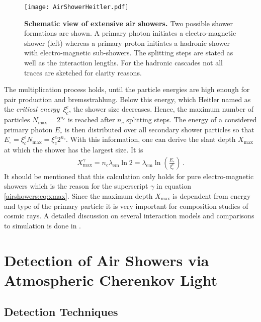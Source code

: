 \begin{figure}[h]
	\texttt{[image: AirShowerHeitler.pdf]}
	\caption[Schematic view of extensive air showers]{\textbf{Schematic view of extensive air showers. \cite{famous:niggemann}} Two possible shower formations are shown. A primary photon initiates a electro-magnetic shower (left) whereas a primary proton initiates a hadronic shower with electro-magnetic sub-showers. The splitting steps are stated as well as the interaction lengths. For the hadronic cascades not all traces are sketched for clarity reasons.}	
	\label{airshowers:cascades}
\end{figure}

The multiplication process holds, until the particle energies are high enough for pair production and bremsstrahlung. Below this energy, which Heitler named as the \textit{critical energy}~$\xi_c^e$, the shower size decreases. Hence, the maximum number of particles $N_\text{max} = 2^{n_c}$ is reached after $n_c$ splitting steps. The energy of a considered primary photon $E_\circ$ is then distributed over all secondary shower particles so that $E_\circ = \xi_c^e N_\text{max} = \xi_c^e 2^{n_c}$. With this information, one can derive the slant depth $X_\text{max}$ at which the shower has the largest size. It is
\begin{align}
	X_\text{max}^\gamma = n_c\lambda_\text{em}\ln{2} = \lambda_\text{em}\ln{\left(\frac{E_\circ}{\xi_c^e}\right)}\,.
	\label{airshowers:eq:xmax}
\end{align}
It should be mentioned that this calculation only holds for pure electro-magnetic showers which is the reason for the superscript $\gamma$ in equation \eqref{airshowers:eq:xmax}. \cite{airshowers:heitlermodel}
Since the maximum depth $X_\text{max}$ is dependent from energy and type of the primary particle it is very important for composition studies of cosmic rays. A detailed discussion on several interaction models and comparisons to simulation is done in \cite{airshowers:heitlermodel}.

\section{Detection of Air Showers via Atmospheric Cherenkov Light}\label{sec:cherenkov}

\subsection{Detection Techniques}

